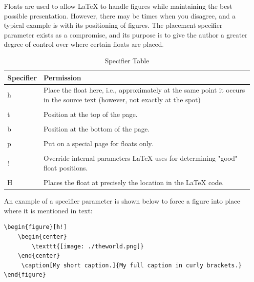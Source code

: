 Floats are used to allow LaTeX to handle figures while maintaining the best possible presentation. However, there may be times when you disagree, and a typical example is with its positioning of figures. The placement specifier parameter exists as a compromise, and its purpose is to give the author a greater degree of control over where certain floats are placed. 


\begin{table}[H]
\caption{Specifier Table}
\begin{tabular}{l p{14cm} }
\hline
Specifier & Permission \\ \hline
h & Place the float here, i.e., approximately at the same point it occurs in the source text (however, not exactly at the spot) \\
\\
t & Position at the top of the page.  \\
\\
b & Position at the bottom of the page.  \\
\\
p & Put on a special page for floats only.  \\
\\
! & Override internal parameters LaTeX uses for determining "good" float positions. \\
\\
H & Places the float at precisely the location in the LaTeX code. \\
\hline
\end{tabular}
\end{table}

An example of a specifier parameter is shown below to force a figure into place where it is mentioned in text: 

\begin{verbatim}
\begin{figure}[h!]
    \begin{center}
        \texttt{[image: ./theworld.png]}
    \end{center}
     \caption[My short caption.]{My full caption in curly brackets.}
\end{figure}
\end{verbatim}